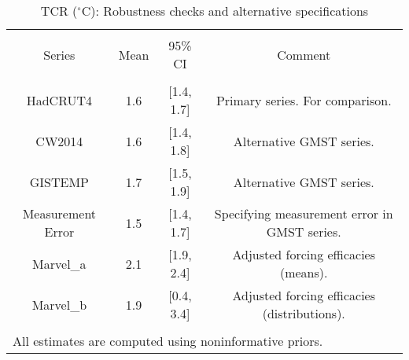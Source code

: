 
\begin{table}[!htbp] \centering 
  \caption{TCR ($^\circ$C): Robustness checks and alternative specifications} 
  \label{tab:tcr-robust} 
\begin{tabular}{@{\extracolsep{5pt}} cccc} 
\\[-1.8ex]\hline 
\hline \\[-1.8ex] 
Series & Mean & 95\% CI & Comment \\ 
\hline \\[-1.8ex] 
HadCRUT4 & 1.6 & [1.4, 1.7] & Primary series. For comparison. \\ 
CW2014 & 1.6 & [1.4, 1.8] & Alternative GMST series. \\ 
GISTEMP & 1.7 & [1.5, 1.9] & Alternative GMST series. \\ 
Measurement Error & 1.5 & [1.4, 1.7] & Specifying measurement error in GMST series. \\ 
Marvel\_a & 2.1 & [1.9, 2.4] & Adjusted forcing efficacies (means). \\ 
Marvel\_b & 1.9 & [0.4, 3.4] & Adjusted forcing efficacies (distributions). \\ 
\hline \\[-1.8ex] 
\multicolumn{4}{l}{\footnotesize All estimates are computed using noninformative priors.} \\ 
\end{tabular} 
\end{table} 
